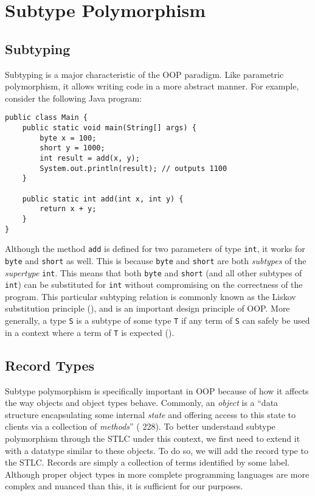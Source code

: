 \section{Subtype Polymorphism}

\subsection{Subtyping}

Subtyping is a major characteristic of the OOP paradigm. Like parametric polymorphism, it allows writing code in a more abstract manner. For example, consider the following Java program:
\begin{lstlisting}[label=lst:SubPol,caption=Subtyping in Java]
public class Main {
	public static void main(String[] args) {
		byte x = 100;
		short y = 1000;
		int result = add(x, y);
		System.out.println(result); // outputs 1100
	}

	public static int add(int x, int y) {
		return x + y;
	}
}
\end{lstlisting}
Although the method \texttt{add} is defined for two parameters of type \texttt{int}, it works for \texttt{byte} and \texttt{short} as well. This is because \texttt{byte} and \texttt{short} are both \textit{subtypes} of the \textit{supertype} \texttt{int}. This means that both \texttt{byte} and \texttt{short} (and all other subtypes of \texttt{int}) can be substituted for \texttt{int} without compromising on the correctness of the program. This particular subtyping relation is commonly known as the Liskov substitution principle (\cite{liskov}), and is an important design principle of OOP. More generally, a type \texttt{S} is a subtype of some type \texttt{T} if any term of \texttt{S} can safely be used in a context where a term of \texttt{T} is expected (\cite{pierce}).

\subsection{Record Types}

Subtype polymorphism is specifically important in OOP because of how it affects the way objects and object types behave. Commonly, an \textit{object} is a ``data structure encapsulating some internal \textit{state} and offering access to this state to clients via a collection of \textit{methods}'' (\cite{pierce} 228). To better understand subtype polymorphism through the STLC under this context, we first need to extend it with a datatype similar to these objects. To do so, we will add the record type to the STLC. Records are simply a collection of terms identified by some label. Although proper object types in more complete programming languages are more complex and nuanced than this, it is sufficient for our purposes.

